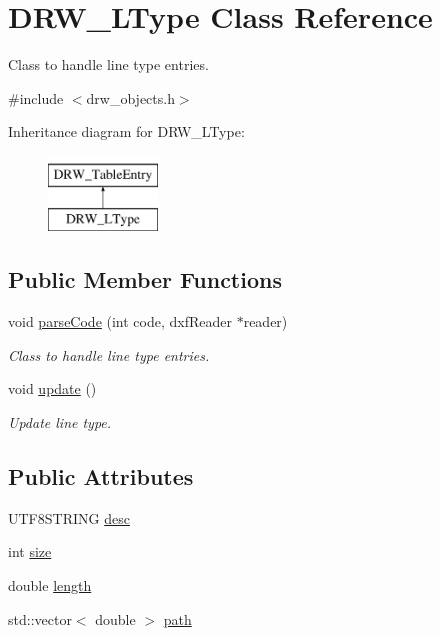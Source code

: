 \hypertarget{class_d_r_w___l_type}{}\section{D\+R\+W\+\_\+\+L\+Type Class Reference}
\label{class_d_r_w___l_type}


Class to handle line type entries.  




{\ttfamily \#include $<$drw\+\_\+objects.\+h$>$}

Inheritance diagram for D\+R\+W\+\_\+\+L\+Type\+:\begin{figure}[H]
\begin{center}
\leavevmode
\includegraphics[height=2.000000cm]{d4/dcc/class_d_r_w___l_type}
\end{center}
\end{figure}
\subsection*{Public Member Functions}
\begin{DoxyCompactItemize}
\item 
void \hyperlink{class_d_r_w___l_type_a7c1bcdc02c5aa43262221ad55dfac6ff}{parse\+Code} (int code, dxf\+Reader $\ast$reader)
\begin{DoxyCompactList}\small\item\em Class to handle line type entries. \end{DoxyCompactList}\item 
void \hyperlink{class_d_r_w___l_type_a9cebdfa5d1ae14720c4fcd50f45dab5a}{update} ()
\begin{DoxyCompactList}\small\item\em Update line type. \end{DoxyCompactList}\end{DoxyCompactItemize}
\subsection*{Public Attributes}
\begin{DoxyCompactItemize}
\item 
U\+T\+F8\+S\+T\+R\+I\+N\+G \hyperlink{class_d_r_w___l_type_ae6f6458c8c9ac100908259558c7e22d2}{desc}
\item 
int \hyperlink{class_d_r_w___l_type_acb78cd0a105ac8b44e19313a4bf90f50}{size}
\item 
double \hyperlink{class_d_r_w___l_type_a438510524566f0deaf77ea694f171762}{length}
\item 
std\+::vector$<$ double $>$ \hyperlink{class_d_r_w___l_type_afb0702d3edab2948fdba2fb861fd3a4b}{path}
\end{DoxyCompactItemize}

